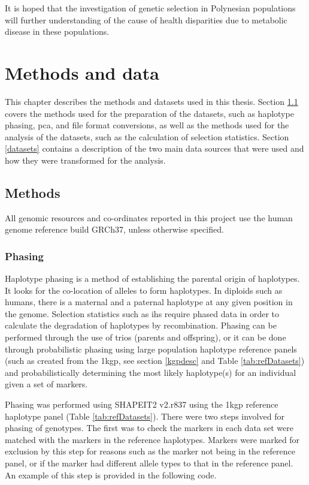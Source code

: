 \documentclass[twoside,openright]{report}
\begin{document}
It is hoped that the investigation of genetic selection in Polynesian
populations will further understanding of the cause of health
disparities due to metabolic disease in these populations.

\chapter{Methods and data}\label{methods-and-data}

This chapter describes the methods and datasets used in this thesis.
Section \ref{methods} covers the methods used for the preparation of the
datasets, such as haplotype phasing, \gls{pca}, and file format
conversions, as well as the methods used for the analysis of the
datasets, such as the calculation of selection statistics. Section
\ref{datasets} contains a description of the two main data sources that
were used and how they were transformed for the analysis.

\section{Methods}\label{methods}

All genomic resources and co-ordinates reported in this project use the
human genome reference build GRCh37, unless otherwise specified.

\subsection{Phasing}\label{phase}

Haplotype phasing is a method of establishing the parental origin of
haplotypes. It looks for the co-location of alleles to form haplotypes.
In diploids such as humans, there is a maternal and a paternal haplotype
at any given position in the genome. Selection statistics such as
\gls{ihs} require phased data in order to calculate the degradation of
haplotypes by recombination. Phasing can be performed through the use of
trios (parents and offspring), or it can be done through probabilistic
phasing using large population haplotype reference panels (such as
created from the \gls{1kgp}, see section \ref{kgpdesc} and Table
\ref{tab:refDatasets}) and probabilistically determining the most likely
haplotype(s) for an individual given a set of markers.

Phasing was performed using SHAPEIT2 v2.r837 \citep{Delaneau2013} using
the \gls{1kgp} reference haplotype panel (Table \ref{tab:refDatasets}).
There were two steps involved for phasing of genotypes. The first was to
check the markers in each data set were matched with the markers in the
reference haplotypes. Markers were marked for exclusion by this step for
reasons such as the marker not being in the reference panel, or if the
marker had different allele types to that in the reference panel. An
example of this step is provided in the following code.
\end{document}
